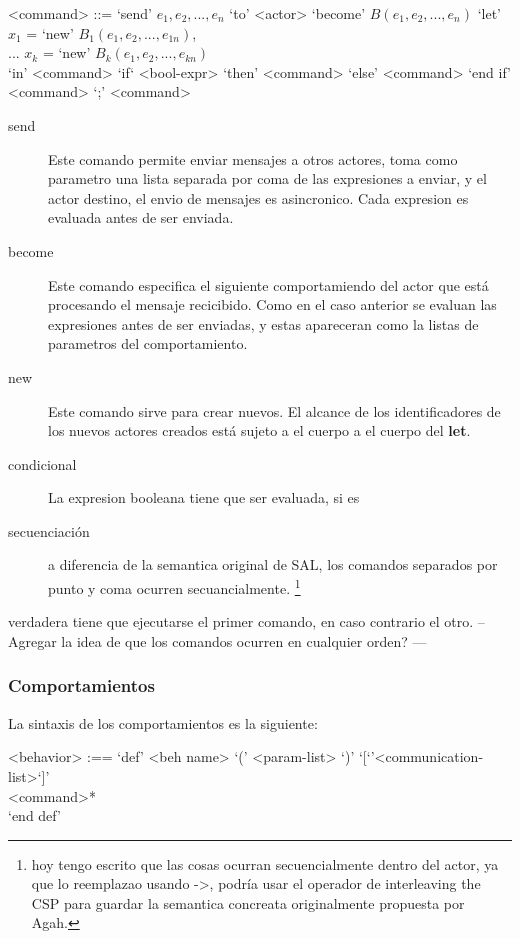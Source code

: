 \documentclass[fleqn]{article}
\begin{document}
\begin{grammar}
<command> ::= `send' $e_1, e_2, ..., e_n$ `to' <actor>
\alt `become' $B(e_1, e_2, ..., e_n)$
\alt `let' $x_1$ = `new' $B_1(e_1, e_2, ..., e_{1n})$, \\ 
 ... $x_k$ = `new' $B_k(e_1, e_2, ..., e_{kn})$        \\
 `in' <command> 
\alt `if` <bool-expr> `then' <command> `else' <command> `end if' 
\alt <command> `;' <command>
\end{grammar}

\begin{description}
\item [send]  Este comando permite enviar mensajes a otros actores, toma como
  parametro una lista separada por coma de las expresiones a enviar, y el actor
  destino, el envio de mensajes es asincronico. Cada expresion es evaluada antes
  de ser enviada.
\item [become] Este comando especifica el siguiente comportamiendo del actor
  que está procesando el mensaje recicibido. Como en el caso anterior se evaluan
  las expresiones antes de ser enviadas, y estas apareceran como la listas de
  parametros del comportamiento. 
\item[new] Este comando sirve para crear nuevos. El alcance de los
  identificadores de los nuevos actores creados está sujeto a el cuerpo a
  el cuerpo del \textbf{let}.
\item[condicional] La expresion booleana tiene que ser evaluada, si es
\item[secuenciación] a diferencia de la semantica original de SAL, los
  comandos separados por punto y coma ocurren secuancialmente. \footnote{hoy
    tengo escrito que las cosas ocurran secuencialmente dentro del actor, ya que
  lo reemplazao usando ->, podría usar el operador de interleaving the CSP para
  guardar la semantica concreata originalmente propuesta por Agah.}
\end{description}
  verdadera tiene que ejecutarse el primer comando, en caso contrario el otro.
-- Agregar la idea de que los comandos ocurren en cualquier orden? ---

\subsubsection{Comportamientos}

La sintaxis de los comportamientos es la siguiente:

\begin{grammar}
  <behavior> :== `def' <beh name> `(' <param-list> `)' `[`'<communication-list>`]' \\
            <command>* \\
  `end def'
\end{grammar}
\end{document}
